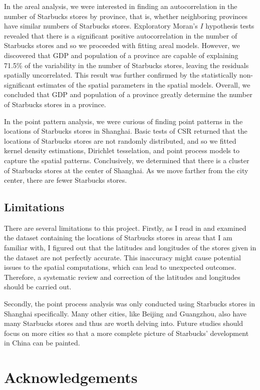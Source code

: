 \documentclass{article}
\begin{document}
In the areal analysis, we were interested in finding an autocorrelation in the number of Starbucks stores by province, that is, whether neighboring provinces have similar numbers of Starbucks stores. Exploratory Moran's \(I\) hypothesis tests revealed that there is a significant positive autocorrelation in the number of Starbucks stores and so we proceeded with fitting areal models. However, we discovered that GDP and population of a province are capable of explaining 71.5\% of the variability in the number of Starbucks stores, leaving the residuals spatially uncorrelated. This result was further confirmed by the statistically non-significant estimates of the spatial parameters in the spatial models. Overall, we concluded that GDP and population of a province greatly determine the number of Starbucks stores in a province.

In the point pattern analysis, we were curious of finding point patterns in the locations of Starbucks stores in Shanghai. Basic tests of CSR returned that the locations of Starbucks stores are not randomly distributed, and so we fitted kernel density estimations, Dirichlet tesselation, and point process models to capture the spatial patterns. Conclusively, we determined that there is a cluster of Starbucks stores at the center of Shanghai. As we move farther from the city center, there are fewer Starbucks stores.

\subsection{Limitations}

There are several limitations to this project. Firstly, as I read in and examined the dataset containing the locations of Starbucks stores in areas that I am familiar with, I figured out that the latitudes and longitudes of the stores given in the dataset are not perfectly accurate. This inaccuracy might cause potential issues to the spatial computations, which can lead to unexpected outcomes. Therefore, a systematic review and correction of the latitudes and longitudes should be carried out.

Secondly, the point process analysis was only conducted using Starbucks stores in Shanghai specifically. Many other cities, like Beijing and Guangzhou, also have many Starbucks stores and thus are worth delving into. Future studies should focus on more cities so that a more complete picture of Starbucks' development in China can be painted.

\section{Acknowledgements}
\end{document}
